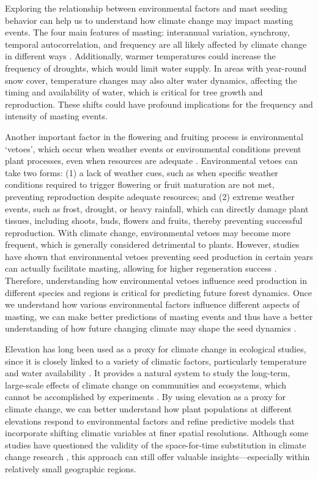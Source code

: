 \documentclass[11pt,letter]{article}
\begin{document}
Exploring the relationship between environmental factors and mast seeding behavior can help us to understand how climate change may impact masting events. The four main features of masting: interannual variation, synchrony, temporal autocorrelation, and frequency are all likely affected by climate change in different ways \citep{hacket2021climate}. Additionally, warmer temperatures could increase the frequency of droughts, which would limit water supply. In areas with year-round snow cover, temperature changes may also alter water dynamics, affecting the timing and availability of water, which is critical for tree growth and reproduction. These shifts could have profound implications for the frequency and intensity of masting events.

Another important factor in the flowering and fruiting process is environmental `vetoes', which occur when weather events or environmental conditions prevent plant processes, even when resources are adequate \citep{bogdziewicz2022will}. Environmental vetoes can take two forms: (1) a lack of weather cues, such as when specific weather conditions required to trigger flowering or fruit maturation are not met, preventing reproduction despite adequate resources; and (2) extreme weather events, such as frost, drought, or heavy rainfall, which can directly damage plant tissues, including shoots, buds, flowers and fruits, thereby preventing successful reproduction. With climate change, environmental vetoes may become more frequent, which is generally considered detrimental to plants. However, studies have shown that environmental vetoes preventing seed production in certain years can actually facilitate masting, allowing for higher regeneration success \citep{bogdziewicz2018correlated, bogdziewicz2019environmental}. Therefore, understanding how environmental vetoes influence seed production in different species and regions is critical for predicting future forest dynamics.  Once we understand how various environmental factors influence different aspects of masting, we can make better predictions of masting events and thus have a better understanding of how future changing climate may shape the seed dynamics \citep{hacket2021climate}.

Elevation has long been used as a proxy for climate change in ecological studies, since it is closely linked to a variety of climatic factors, particularly temperature and water availability \citep{korner2007use}. It provides a natural system to study the long-term, large-scale effects of climate change on communities and ecosystems, which cannot be accomplished by experiments \citep{sundqvist2013community}. By using elevation as a proxy for climate change, we can better understand how plant populations at different elevations respond to environmental factors and refine predictive models that incorporate shifting climatic variables at finer spatial resolutions. Although some studies have questioned the validity of the space-for-time substitution in climate change research \citep{perret2024species}, this approach can still offer valuable insights—especially within relatively small geographic regions.
\end{document}
